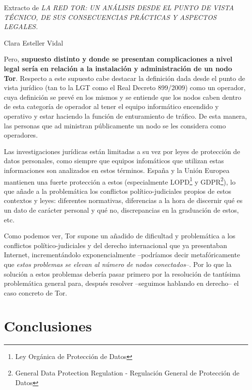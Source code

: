 \documentclass[a4paper, 11pt, titlepage]{article}
\begin{document}
        \begin{flushright}Extracto de \emph{LA RED TOR: UN ANÁLISIS DESDE EL PUNTO DE VISTA TÉCNICO, DE SUS CONSECUENCIAS 
            PRÁCTICAS Y ASPECTOS LEGALES.}\end{flushright}
        \begin{flushright}Clara Esteller Vidal\end{flushright}
        Pero, \textbf{supuesto distinto y donde se presentan complicaciones a nivel legal sería en relación a la instalación 
        y administración de un nodo Tor}. Respecto  a  este  supuesto  cabe  destacar la  definición  dada  desde  el  
        punto  de  vista jurídico  (tan to  la  LGT  como  el  Real  Decreto 899/2009) como  un  operador,  cuya 
        definición se prevé en los mismos y se entiende que los nodos caben dentro de esta categoría de operador al 
        tener el equipo informático encendido y operativo y estar haciendo la función de enturamiento de tráfico. De 
        esta manera, las personas que ad ministran públicamente un nodo se les considera como operadores.

        Las investigaciones jurídicas están limitadas a su vez por leyes de protección de datos personales, como siempre 
        que equipos infomáticos que utilizan estas informaciones son analizados en estos términos. España y la Unión 
        Europea mantienen una fuerte protección a estos (especialmente LOPD\footnote{Ley Orgánica de Protección de Datos} 
        y GDPR\footnote{General Data Protection Regulation - Regulación General de Protección de Datos}), lo que añade a 
        la problemática los conflictos político-judiciales propios de estos contextos y leyes: diferentes normativas, 
        diferencias a la hora de discernir qué es un dato de carácter personal y qué no, discrepancias en la graduación 
        de estos, etc.

        Como podemos ver, Tor supone un añadido de dificultad y problemática a los conflictos político-judiciales y 
        del derecho internacional que ya presentaban Internet, incrementándolo exponencialmente --podríamos decir 
        metafóricamente que \emph{estos problemas se elevan al número de nodos conectados}--. Por lo que la solución a 
        estos problemas debería pasar primero por la resolución de tantísima problemática general para, después resolver 
        --seguimos hablando en derecho-- el caso concreto de Tor.

\section{Conclusiones}
\end{document}
